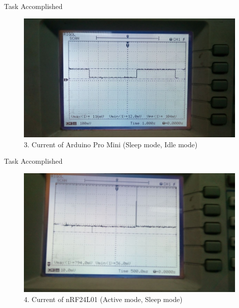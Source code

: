 \documentclass[10pt, a4paper]{beamer}
\begin{document}
\begin{frame}{Task Accomplished}
\begin{figure}
\begin{center}
\includegraphics[width=1\textwidth]{pro_mini_current_vtg_2.jpeg}
\caption{3. Current of Arduino Pro Mini (Sleep mode, Idle mode)}
\end{center}
\end{figure}
\end{frame}

\begin{frame}{Task Accomplished}
\begin{figure}
\begin{center}

\includegraphics[width=1\textwidth]{IMG-20180606-WA0003.jpg}
\caption{4. Current of nRF24L01 (Active mode, Sleep mode)}
\end{center}
\end{figure}
\end{frame}
\end{document}
